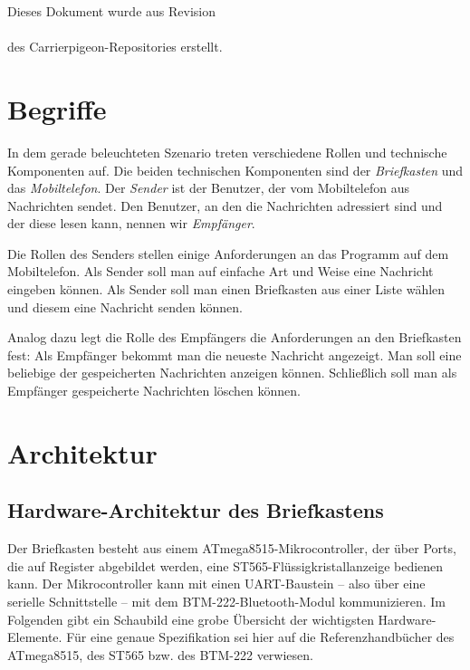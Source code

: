 \documentclass[ngerman]{article}
\begin{document}
Dieses Dokument wurde aus Revision \\
\texttt{} \\des
Carrierpigeon-Repositories erstellt.

\section{Begriffe}

In dem gerade beleuchteten Szenario treten verschiedene Rollen und technische
Komponenten auf. Die beiden technischen Komponenten sind der
\textit{Briefkasten} und das \textit{Mobiltelefon}. Der \textit{Sender} ist der
Benutzer, der vom Mobiltelefon aus Nachrichten sendet. Den Benutzer, an den die
Nachrichten adressiert sind und der diese lesen kann, nennen wir
\textit{Empfänger}.

Die Rollen des Senders stellen einige Anforderungen an das Programm auf dem
Mobiltelefon. Als Sender soll man auf einfache Art und Weise eine Nachricht
eingeben können. Als Sender soll man einen Briefkasten aus einer Liste wählen
und diesem eine Nachricht senden können.

Analog dazu legt die Rolle des Empfängers die Anforderungen an den Briefkasten
fest: Als Empfänger bekommt man die neueste Nachricht an\-gezeigt. Man soll
eine beliebige der gespeicherten Nachrichten anzeigen können. Schließlich soll
man als Empfänger gespeicherte Nachrichten löschen können.

\section{Architektur}

\subsection{Hardware-Architektur des Briefkastens}

Der Briefkasten besteht aus einem ATmega8515-Mikrocontroller, der über Ports,
die auf Register abgebildet werden, eine ST565-Flüssigkristallanzeige bedienen
kann. Der Mikrocontroller kann mit einen UART-Baustein -- also über eine serielle
Schnittstelle -- mit dem BTM-222-Bluetooth-Modul kommunizieren. Im Folgenden
gibt ein Schaubild eine grobe Übersicht der wichtigsten Hardware-Elemente. Für
eine genaue Spezifikation sei hier auf die Referenzhandbücher des ATmega8515,
des ST565 bzw. des BTM-222 verwiesen.
\end{document}
